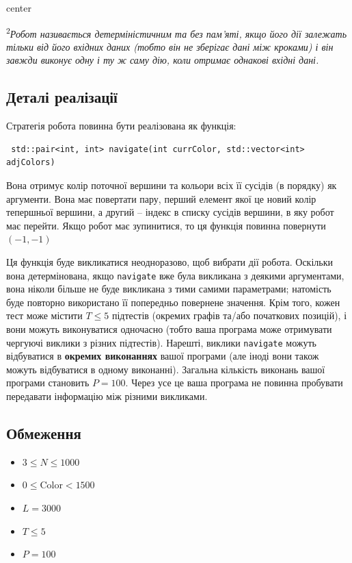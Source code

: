 \documentclass[12pt]{article}
\begin{document}
\begin{adjustbox}{center}
	
\end{adjustbox}

\textsuperscript{2}\textit{Робот називається детерміністичним та без пам'яті, якщо його дії залежать тільки від його вхідних даних (тобто він не зберігає дані між кроками) і він завжди виконує одну і ту ж саму дію, коли отримає однакові вхідні дані.}

\subsection{Деталі реалізації}
Стратегія робота повинна бути реалізована як функція:
\begin{lstlisting}
 std::pair<int, int> navigate(int currColor, std::vector<int> adjColors)
\end{lstlisting}

Вона отримує колір поточної вершини та кольори всіх її сусідів (в порядку) як аргументи. Вона має повертати пару, перший елемент якої це новий колір тепершньої вершини, а другий -- індекс в списку сусідів вершини, в яку робот має перейти. Якщо робот має зупинитися, то ця функція повинна повернути $(-1, -1)$

Ця функція буде викликатися неодноразово, щоб вибрати дії робота. Оскільки вона детермінована, якщо \texttt{navigate} вже була викликана з деякими аргументами, вона ніколи більше не буде викликана з тими самими параметрами; натомість буде повторно використано її попередньо повернене значення. Крім того, кожен тест може містити $T \leq 5$ підтестів (окремих графів та/або початкових позицій), і вони можуть виконуватися одночасно (тобто ваша програма може отримувати чергуючі виклики з різних підтестів). Нарешті, виклики \texttt{navigate} можуть відбуватися в \textbf{окремих виконаннях} вашої програми (але іноді вони також можуть відбуватися в одному виконанні). Загальна кількість виконань вашої програми становить $P = 100$. Через усе це ваша програма не повинна пробувати передавати інформацію між різними викликами.

\subsection{Обмеження}

\begin{itemize}
\item $3 \leq N \leq 1000$
\item $0 \leq \mathrm{Color} < 1500$
\item $L = 3000$
\item $T \leq 5$
\item $P = 100$
\end{itemize}
\end{document}
